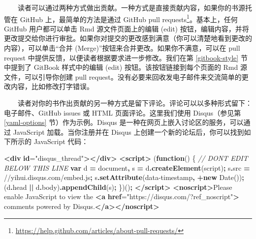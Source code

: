 \documentclass[
  12pt,
]{krantz}
\newenvironment{Shaded}{\begin{snugshade}}{\end{snugshade}}
\newcommand{\AttributeTok}[1]{\textcolor[rgb]{0.13,0.29,0.53}{#1}}
\newcommand{\BuiltInTok}[1]{#1}
\newcommand{\CommentTok}[1]{\textcolor[rgb]{0.56,0.35,0.01}{\textit{#1}}}
\newcommand{\ErrorTok}[1]{\textcolor[rgb]{0.64,0.00,0.00}{\textbf{#1}}}
\newcommand{\FunctionTok}[1]{\textcolor[rgb]{0.13,0.29,0.53}{\textbf{#1}}}
\newcommand{\KeywordTok}[1]{\textcolor[rgb]{0.13,0.29,0.53}{\textbf{#1}}}
\newcommand{\NormalTok}[1]{#1}
\newcommand{\OperatorTok}[1]{\textcolor[rgb]{0.81,0.36,0.00}{\textbf{#1}}}
\newcommand{\OtherTok}[1]{\textcolor[rgb]{0.56,0.35,0.01}{#1}}
\newcommand{\StringTok}[1]{\textcolor[rgb]{0.31,0.60,0.02}{#1}}
\renewcommand{\href}[2]{#2\footnote{\url{#1}}}
\theoremstyle{definition}
\theoremstyle{definition}
\theoremstyle{definition}
\theoremstyle{definition}
\theoremstyle{remark}
\begin{document}
  读者可以通过两种方式做出贡献。一种方式是直接贡献内容，如果你的书源托管在 GitHub 上，最简单的方法是通过 \href{https://help.github.com/articles/about-pull-requests/}{GitHub pull requests}。基本上，任何 GitHub 用户都可以单击 Rmd 源文件页面上的编辑 (edit) 按钮，编辑内容，并将更改提交给你进行审批。如果你对提交的更改感到满意（你可以清楚地看到更改的内容），可以单击``合并 (Merge)''按钮来合并更改。如果你不满意，可以在 pull request 中提供反馈，以便读者根据要求进一步修改。我们在第 \ref{gitbook-style} 节中提到了 GitBook 样式中的编辑 (edit) 按钮。该按钮链接到每个页面的 Rmd 源文件，可以引导你创建 pull request。没有必要来回收发电子邮件来交流简单的更改内容，比如修改打字错误。

  读者对你的书作出贡献的另一种方式是留下评论。评论可以以多种形式留下：电子邮件、GitHub issues 或 HTML 页面评论。这里我们使用 Disqus（参见第 \ref{yaml-options} 节）作为示例。Disqus 是一种在网页上嵌入讨论区的服务，可以通过 JavaScript 加载。当你注册并在 Disqus 上创建一个新的论坛后，你可以找到如下所示的 JavaScript 代码：

\begin{Shaded}
\begin{Highlighting}[]
\KeywordTok{\textless{}div} \ErrorTok{id}\OtherTok{=}\StringTok{"disqus\_thread"}\KeywordTok{\textgreater{}\textless{}/div\textgreater{}}
\KeywordTok{\textless{}script\textgreater{}}
\NormalTok{(}\KeywordTok{function}\NormalTok{() \{ }\CommentTok{// DON\textquotesingle{}T EDIT BELOW THIS LINE}
\KeywordTok{var}\NormalTok{ d }\OperatorTok{=} \BuiltInTok{document}\OperatorTok{,}\NormalTok{ s }\OperatorTok{=}\NormalTok{ d}\OperatorTok{.}\FunctionTok{createElement}\NormalTok{(}\StringTok{\textquotesingle{}script\textquotesingle{}}\NormalTok{)}\OperatorTok{;}
\NormalTok{s}\OperatorTok{.}\AttributeTok{src} \OperatorTok{=} \StringTok{\textquotesingle{}//yihui.disqus.com/embed.js\textquotesingle{}}\OperatorTok{;}
\NormalTok{s}\OperatorTok{.}\FunctionTok{setAttribute}\NormalTok{(}\StringTok{\textquotesingle{}data{-}timestamp\textquotesingle{}}\OperatorTok{,} \OperatorTok{+}\KeywordTok{new} \BuiltInTok{Date}\NormalTok{())}\OperatorTok{;}
\NormalTok{(d}\OperatorTok{.}\AttributeTok{head} \OperatorTok{||}\NormalTok{ d}\OperatorTok{.}\AttributeTok{body}\NormalTok{)}\OperatorTok{.}\FunctionTok{appendChild}\NormalTok{(s)}\OperatorTok{;}
\NormalTok{\})()}\OperatorTok{;}
\KeywordTok{\textless{}/script\textgreater{}}
\KeywordTok{\textless{}noscript\textgreater{}}\NormalTok{Please enable JavaScript to view the}
\KeywordTok{\textless{}a} \ErrorTok{href}\OtherTok{=}\StringTok{"https://disqus.com/?ref\_noscript"}\KeywordTok{\textgreater{}}
\NormalTok{  comments powered by Disqus.}\KeywordTok{\textless{}/a\textgreater{}\textless{}/noscript\textgreater{}}
\end{Highlighting}
\end{Shaded}
\end{document}
